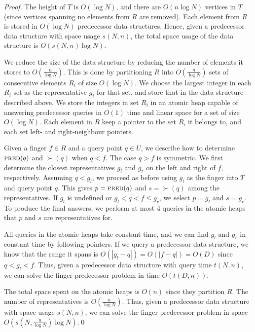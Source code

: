 \begin{proof}
The height of $T$ is $O(\log N)$, and there are $O(n \log N)$ vertices in $T$ (since vertices spanning no elements from $R$ are removed). Each element from $R$ is stored in $O(\log N)$ predecessor data structures. Hence, given a predecessor data structure with space usage $s(N, n)$, the total space usage of the data structure is $O(s(N, n) \log N)$. 

We reduce the size of the data structure by reducing the number of elements it stores to $O(\frac{n}{\log N})$. This is done by partitioning $R$ into $O(\frac{n}{\log N})$ sets of consecutive elements $R_i$ of size $O(\log N)$. We choose the largest integer in each $R_i$ set as the representative $g_i$ for that set, and store that in the data structure described above. We store the integers in set $R_i$ in an atomic heap \cite{fredmanwillardfusion, Hagerup1998} capable of answering predecessor queries in $O(1)$ time and linear space for a set of size $O(\log N)$. Each element in $R$ keep a pointer to the set $R_i$ it belongs to, and each set left- and right-neighbour pointers.

Given a finger $f \in R$ and a query point $q \in U$, we describe how to determine $\textsc{pred}(q)$ and $\succ(q)$ when $q < f$. The case $q > f$ is symmetric. We first determine the closest representatives $g_l$ and $g_r$ on the left and right of $f$, respectively. Assuming $q < g_l$, we proceed as before using $g_l$ as the finger into $T$ and query point $q$. This gives $p = \textsc{pred}(q)$ and $s = \succ(q)$ among the representatives. If $g_l$ is undefined or $g_l < q < f \leq g_r$, we select $p = g_l$ and $s = g_r$.
To produce the final answers, we perform at most 4 queries in the atomic heaps that $p$ and $s$ are representatives for. 

All queries in the atomic heaps take constant time, and we can find $g_l$ and $g_r$ in constant time by following pointers. If we query a predecessor data structure, we know that the range it spans is $O(|g_l - q|) = O(|f-q|) = O(D)$ since $q < g_l < f$. Thus, given a predecessor data structure with query time $t(N, n)$, we can solve the finger predecessor problem in time $O(t(D, n))$.

The total space spent on the atomic heaps is $O(n)$ since they partition $R$. The number of representatives is $O(\frac{n}{\log N})$. Thus, given a predecessor data structure with space usage $s(N, n)$, we can solve the finger predecessor problem in space $O(s(N, \frac{n}{\log N}) \log N)$.\qed
\end{proof}

